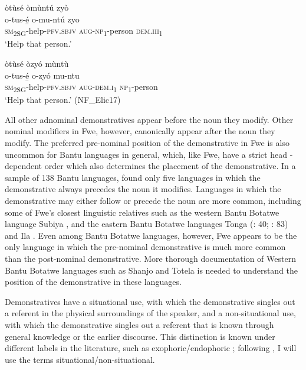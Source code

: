 \ea
\label{helpthatperson}
òtùsé òmùntú zyò\\
\gll o-tus-é̲      o-mu-ntú    zyo\\
\textsc{sm}\textsubscript{2SG}-help-\textsc{pfv}.\textsc{sbjv}  \textsc{aug}-\textsc{np}\textsubscript{1}-person  \textsc{dem}.\textsc{iii}\textsubscript{1}\\
\glt ‘Help that person.’
\z

\ea
\label{bkm:Ref494891071}
òtùsé òzyó mùntù\\
\gll o-tus-é̲    o-zyó    mu-ntu\\
\textsc{sm}\textsubscript{2SG}-help-\textsc{pfv}.\textsc{sbjv}  \textsc{aug}-\textsc{dem}.\textsc{i}\textsubscript{1}  \textsc{np}\textsubscript{1}-person\\
\glt ‘Help that person.’ (NF\_Elic17)
\z

\hspace*{-1.73pt}All other adnominal demonstratives appear before the noun they modify. Other nominal modifiers in Fwe, however, canonically appear after the noun they modify. The preferred pre-nominal position of the demonstrative in Fwe is also uncommon for Bantu languages in general, which, like Fwe, have a strict head - dependent order which also determines the placement of the demonstrative. In a sample of 138 Bantu languages, {\citet{Velde2005}} found only five languages in which the demonstrative always precedes the noun it modifies. Languages in which the demonstrative may either follow or precede the noun are more common, including some of Fwe’s closest linguistic relatives such as the western Bantu Botatwe language Subiya \citep[33]{Jacottet1896}, and the eastern Bantu Botatwe languages Tonga (\citealt{Carter2002}: 40; \citealt{Collins1962}: 83) and Ila \citep[105]{Smith1964}. Even among Bantu Botatwe languages, however, Fwe appears to be the only language in which the pre-nominal demonstrative is much more common than the post-nominal demonstrative. More thorough documentation of Western Bantu Botatwe languages such as Shanjo and Totela is needed to understand the position of the demonstrative in these languages.

Demonstratives have a situational use, with which the demonstrative singles out a referent in the physical surroundings of the speaker, and a non-situational use, with which the demonstrative singles out a referent that is known through general knowledge or the earlier discourse. This distinction is known under different labels in the literature, such as exophoric/endophoric \citep{Diessel1999}; following {\citet{Himmelmann1996}}, I will use the terms situational/non-situational.


